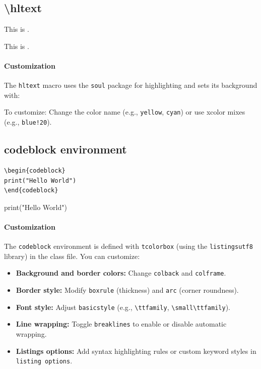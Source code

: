 \documentclass{lecturenotes}
\begin{document}
\subsection{\textbackslash hltext}\label{sec:hltext}
\begin{codeblock}
This is .
\end{codeblock}

This is .

\paragraph{Customization}
The \texttt{hltext} macro uses the \texttt{soul} package for highlighting and sets its background with:
\begin{codeblock}
\end{codeblock}
To customize: Change the color name (e.g., \texttt{yellow}, \texttt{cyan}) or use xcolor mixes (e.g., \texttt{blue!20}).
 

\subsection{codeblock environment}\label{sec:codeblock}

\begin{verbatim}
\begin{codeblock}
print("Hello World")
\end{codeblock}
\end{verbatim}

\begin{codeblock}
print("Hello World")
\end{codeblock}

\paragraph{Customization}
The \texttt{codeblock} environment is defined with \texttt{tcolorbox} (using the \texttt{listingsutf8} library) in the class file.  
You can customize:
\begin{itemize}
    \item \textbf{Background and border colors:} Change \texttt{colback} and \texttt{colframe}.
    \item \textbf{Border style:} Modify \texttt{boxrule} (thickness) and \texttt{arc} (corner roundness).
    \item \textbf{Font style:} Adjust \texttt{basicstyle} (e.g., \verb|\ttfamily|, \verb|\small\ttfamily|).
    \item \textbf{Line wrapping:} Toggle \texttt{breaklines} to enable or disable automatic wrapping.
    \item \textbf{Listings options:} Add syntax highlighting rules or custom keyword styles in \texttt{listing options}.
\end{itemize}
\end{document}
